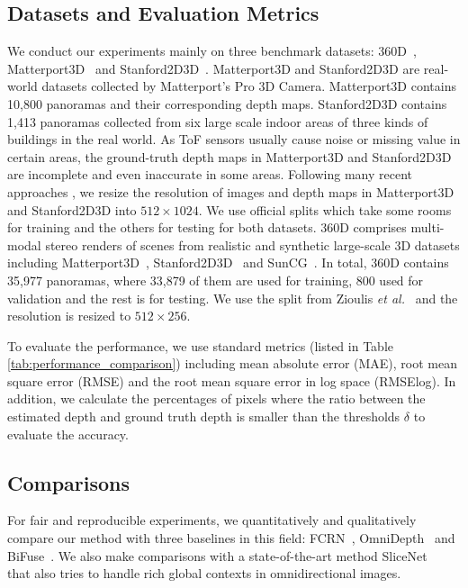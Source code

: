\documentclass[10pt,twocolumn,letterpaper]{article}
\begin{document}
\subsection{Datasets and Evaluation Metrics}
We conduct our experiments mainly on three benchmark datasets: 360D~\cite{3D60}, Matterport3D~\cite{Matterport3D} and Stanford2D3D~\cite{Stanford3D}. 
Matterport3D and Stanford2D3D are real-world datasets collected by Matterport’s Pro 3D Camera. Matterport3D contains 10,800 panoramas and their corresponding depth maps. Stanford2D3D contains 1,413 panoramas collected from six large scale indoor areas of three kinds of buildings in the real world. As ToF sensors usually cause noise or missing value in certain areas, the ground-truth depth maps in Matterport3D and Stanford2D3D are incomplete and even inaccurate in some areas. Following many recent approaches \cite{9157424,Pintore_2021_CVPR}, we resize the resolution of images and depth maps in Matterport3D and Stanford2D3D into $512\times 1024$. We use official splits which take some rooms for training and the others for testing for both datasets. 360D comprises multi-modal stereo renders of scenes from realistic and synthetic large-scale 3D datasets including Matterport3D~\cite{Matterport3D}, Stanford2D3D~\cite{Stanford3D} and SunCG~\cite{SunCG}. 
In total, 360D contains 35,977 panoramas, where 33,879 of them are used for training, 800 used for validation and the rest is for testing. We use the split from Zioulis \emph{et al.}~\cite{3D60} and the resolution is resized to $512\times 256$.

To evaluate the performance, we use standard metrics (listed in Table \ref{tab:performance_comparison}) including mean absolute error (MAE), root mean square error (RMSE) and the root mean square error in log space (RMSElog). 
In addition, we calculate the percentages of pixels where the ratio between the estimated depth and ground truth depth is smaller than the thresholds $\delta$ to evaluate the accuracy.

\subsection{Comparisons}

For fair and reproducible experiments, we quantitatively and qualitatively compare our method with three baselines in this field: FCRN~\cite{Laina_2016_3DV}, OmniDepth~\cite{3D60} and BiFuse~\cite{9157424}. We also make comparisons with a state-of-the-art method SliceNet~\cite{Pintore_2021_CVPR} that also tries to handle rich global contexts in omnidirectional images. 
\end{document}

